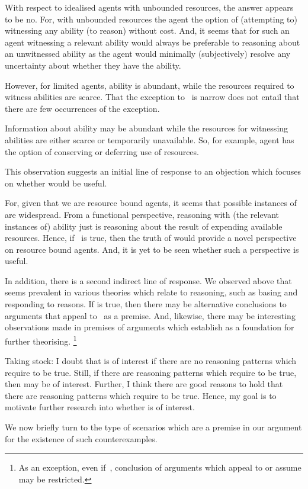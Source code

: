 \begin{note}
  With respect to idealised agents with unbounded resources, the answer appears to be no.
  For, with unbounded resources the agent the option of (attempting to) witnessing any ability (to reason) without cost.
  And, it seems that for such an agent witnessing a relevant ability would always be preferable to reasoning about an unwitnessed ability as the agent would minimally (subjectively) resolve any uncertainty about whether they have the ability.

  However, for limited agents, ability is abundant, while the resources required to witness abilities are scarce.
  That the exception to~\ESU{} is narrow does not entail that there are few occurrences of the exception.

  Information about ability may be abundant while the resources for witnessing abilities are either scarce or temporarily unavailable.
  So, for example, agent has the option of conserving or deferring use of resources.

  This observation suggests an initial line of response to an objection which focuses on whether \EAS{} would be useful.

  For, given that we are resource bound agents, it seems that possible instances of \EAS{} are widespread.
  From a functional perspective, reasoning with (the relevant instances of) ability just is reasoning about the result of expending available resources.
  Hence, if~\EAS{} is true, then the truth of \EAS{} would provide a novel perspective on resource bound agents.
  And, it is yet to be seen whether such a perspective is useful.

  In addition, there is a second indirect line of response.
  We observed above that \ESU{} seems prevalent in various theories which relate to reasoning, such as basing and responding to reasons.
  If \EAS{} is true, then there may be alternative conclusions to arguments that appeal to~\ESU{} as a premise.
  And, likewise, there may be interesting observations made in premises of arguments which establish \ESU{} as a foundation for further theorising.\nolinebreak
  \footnote{
    As an exception, even if~\EAS{}, conclusion of arguments which appeal to or assume \ESU{} may be restricted.
  }

  Taking stock:
  I doubt that \EAS{} is of interest if there are no reasoning patterns which require \EAS{} to be true.
  Still, if there are reasoning patterns which require \EAS{} to be true, then \EAS{} may be of interest.
  Further, I think there are good reasons to hold that there are reasoning patterns which require \EAS{} to be true.
  Hence, my goal is to motivate further research into whether \EAS{} is of interest.

  We now briefly turn to the type of scenarios which are a premise in our argument for the existence of such counterexamples.
\end{note}

